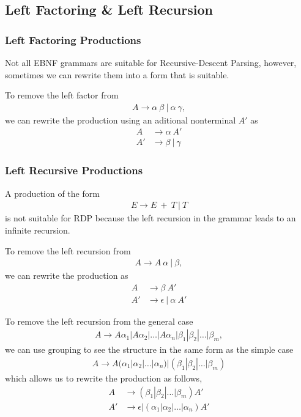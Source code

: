 \subsection{Left Factoring \& Left Recursion}

\subsubsection{Left Factoring Productions}
Not all EBNF grammars are suitable for Recursive-Descent Parsing, 
however, sometimes we can rewrite them into a form that is suitable.

To remove the left factor from
\begin{align*}
    A \rightarrow \alpha\ \beta\ |\ \alpha\ \gamma,
\end{align*}
we can rewrite the production using an aditional nonterminal $A'$ as
\begin{align*}
    A &\rightarrow \alpha\ A'\\
    A' &\rightarrow \beta\ |\ \gamma
\end{align*}
\subsubsection{Left Recursive Productions}
A production of the form
\begin{align*}
    E \rightarrow E\ +\ T\ |\ T
\end{align*}
is not suitable for RDP because the left recursion in the grammar leads to an infinite recursion.

To remove the left recursion from
\begin{align*}
    A \rightarrow A\ \alpha\ |\ \beta,
\end{align*}
we can rewrite the production as
\begin{align*}
    A &\rightarrow \beta\ A'\\
    A' &\rightarrow \epsilon\ |\ \alpha\ A'
\end{align*}

To remove the left recursion from the general case
\begin{align*}
    A \rightarrow A\alpha_1|A\alpha_2|\dots|A\alpha_n|\beta_1|\beta_2|\dots|\beta_m,
\end{align*}
we can use grouping to see the structure in the same form as the simple case
\begin{align*}
    A \rightarrow A(\alpha_1|\alpha_2|\dots|\alpha_n)|(\beta_1|\beta_2|\dots|\beta_m)
\end{align*}
which allows us to rewrite the production as follows,
\begin{align*}
    A &\rightarrow (\beta_1|\beta_2|\dots|\beta_m)A'\\
    A' &\rightarrow \epsilon|(\alpha_1|\alpha_2|\dots|\alpha_n)A'
\end{align*}

